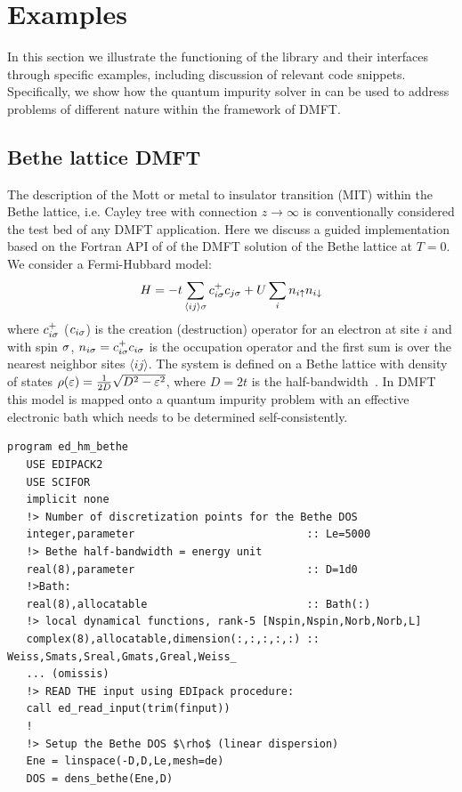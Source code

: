 \documentclass[edipack2.tex]{subfiles}
\begin{document}
\section{Examples}\label{SecExamples}
In this section we illustrate the functioning of the \NAME
library and their interfaces through specific examples, including
discussion of relevant code snippets.
Specifically, we show how the quantum impurity solver in \NAME can be used
to address problems of different nature within the framework of DMFT. 


\subsection{Bethe lattice DMFT}\label{SecExamplesBetheDMFT}
The description of the Mott or metal to insulator transition (MIT)
within the Bethe lattice, i.e. Cayley tree with connection
$z\to\infty$ is conventionally considered the test bed of any DMFT
application. Here  we discuss a guided implementation based on the
Fortran API of \NAME of the DMFT solution of the Bethe lattice at
$T=0$. 
We consider a Fermi-Hubbard model:
$$
H = -t \sum_{\langle ij\rangle\sigma}c^+_{i\sigma}c_{j\sigma} + U \sum_i n_{i\uparrow}n_{i\downarrow}
$$
where $c^+_{i\sigma}$ ($c_{i\sigma}$) is the creation (destruction) operator for an electron at site $i$
and with spin $\sigma$, $n_{i\sigma}=c^+_{i\sigma}c_{i\sigma}$ is the occupation
operator and the first sum is over the nearest neighbor sites $\langle
ij\rangle$. 
The system is defined on a Bethe lattice with density of states
$\rho(\varepsilon)=\frac{1}{2D}\sqrt{D^2-\varepsilon^2}$, where $D=2t$ is the
half-bandwidth~\cite{Georges1996}.
In DMFT this model is mapped
onto a quantum impurity problem with an effective electronic bath
which needs to be determined self-consistently.
\begin{lstlisting}[style=fstyle,numbers=none,basicstyle={\scriptsize\ttfamily}]
program ed_hm_bethe
   USE EDIPACK2
   USE SCIFOR
   implicit none
   !> Number of discretization points for the Bethe DOS
   integer,parameter                           :: Le=5000
   !> Bethe half-bandwidth = energy unit
   real(8),parameter                           :: D=1d0
   !>Bath:
   real(8),allocatable                         :: Bath(:)
   !> local dynamical functions, rank-5 [Nspin,Nspin,Norb,Norb,L]
   complex(8),allocatable,dimension(:,:,:,:,:) :: Weiss,Smats,Sreal,Gmats,Greal,Weiss_
   ... (omissis)
   !> READ THE input using EDIpack procedure:
   call ed_read_input(trim(finput))
   !
   !> Setup the Bethe DOS $\rho$ (linear dispersion)
   Ene = linspace(-D,D,Le,mesh=de)
   DOS = dens_bethe(Ene,D)
\end{lstlisting}
\end{document}
